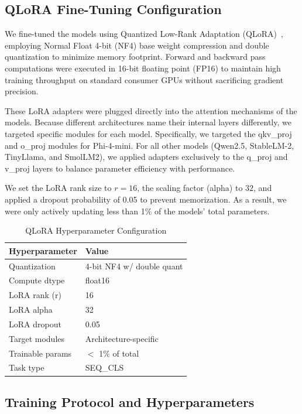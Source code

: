 \documentclass[journal]{IEEEtran}
\begin{document}
\subsection{QLoRA Fine-Tuning Configuration}

We fine-tuned the models using Quantized Low-Rank Adaptation (QLoRA)~\cite{ref11}, employing Normal Float 4-bit (NF4) base weight compression and double quantization to minimize memory footprint. Forward and backward pass computations were executed in 16-bit floating point (FP16) to maintain high training throughput on standard consumer GPUs without sacrificing gradient precision.

These LoRA adapters were plugged directly into the attention mechanisms of the models. Because different architectures name their internal layers differently, we targeted specific modules for each model. Specifically, we targeted the qkv\_proj and o\_proj modules for Phi-4-mini. For all other models (Qwen2.5, StableLM-2, TinyLlama, and SmolLM2), we applied adapters exclusively to the q\_proj and v\_proj layers to balance parameter efficiency with performance.

We set the LoRA rank size to $r=16$, the scaling factor (alpha) to $32$, and applied a dropout probability of 0.05 to prevent memorization. As a result, we were only actively updating less than 1\% of the models' total parameters.

\begin{table}[htbp]
\caption{QLoRA Hyperparameter Configuration}
\label{tab:qlora}
\centering
\begin{tabular}{ll}
\toprule
\textbf{Hyperparameter} & \textbf{Value} \\
\midrule
Quantization & 4-bit NF4 w/ double quant \\
Compute dtype & float16 \\
LoRA rank (r) & 16 \\
LoRA alpha & 32 \\
LoRA dropout & 0.05 \\
Target modules & Architecture-specific \\
Trainable params & $<$ 1\% of total \\
Task type & SEQ\_CLS \\
\bottomrule
\end{tabular}
\end{table}

\subsection{Training Protocol and Hyperparameters}
\end{document}
